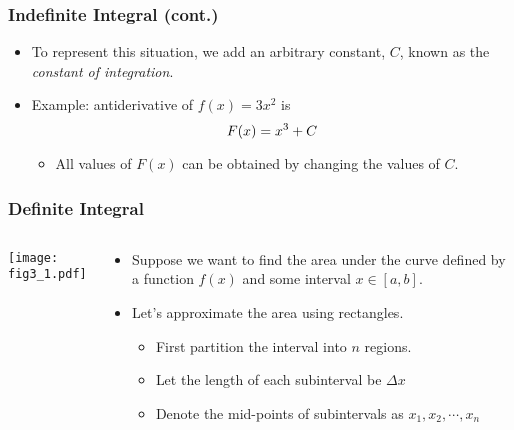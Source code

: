 \documentclass[pdflatex, 12pt]{beamer}
\begin{document}
\begin{frame}
\frametitle{Indefinite Integral (cont.)}
\begin{itemize}
\item To represent this situation, we add an arbitrary constant, $C$, known as the \emph{constant of integration}.
\vspace{0.4cm}
\item Example: antiderivative of $f(x) = 3x^2$ is 
 \begin{equation}
 F(x) = x^3 + C \notag
 \end{equation}
 \begin{itemize}
 \item All values of $F(x)$ can be obtained by changing the values of $C$.
 \end{itemize}
\end{itemize}	
\end{frame}

\begin{frame}
\frametitle{Definite Integral}
\begin{columns}
\begin{column}{0.5\textwidth}
\texttt{[image: fig3\_1.pdf]}
\end{column}
\begin{column}{0.5\textwidth}
\begin{itemize}
\item Suppose we want to find the area under the curve defined by a function $f(x)$ and some interval $x \in [a, b]$.
\vspace{0.4cm}
\item Let's approximate the area using rectangles.
 \begin{itemize}
 \item First partition the interval into $n$ regions.
 \item Let the length of each subinterval be $\Delta x$
 \item Denote the mid-points of subintervals as $x_1, x_2, \cdots, x_n$ 
 \end{itemize}
\end{itemize}
\end{column}
\end{columns}
\end{frame}
\end{document}
